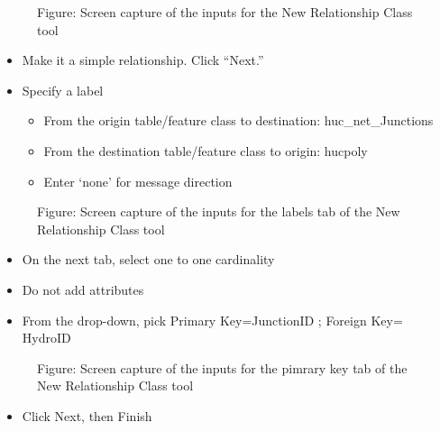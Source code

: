 \documentclass[letterpaper,10pt,english]{sphinxmanual}
\begin{document}
\begin{figure}[htbp]
\centering
\capstart

\noindent{}
\caption{Figure: Screen capture of the inputs for the New Relationship Class tool}\label{\detokenize{ex_2:id40}}\end{figure}
\begin{itemize}
\item {} 
Make it a simple relationship. Click “Next.”

\item {} 
Specify a label
\begin{itemize}
\item {} 
From the origin table/feature class to destination: huc\_net\_Junctions

\item {} 
From the destination table/feature class to origin: hucpoly

\item {} 
Enter ‘none’ for message direction

\end{itemize}

\end{itemize}

\begin{figure}[htbp]
\centering
\capstart

\noindent{}
\caption{Figure: Screen capture of the inputs for the labels tab of the New Relationship Class tool}\label{\detokenize{ex_2:id41}}\end{figure}
\begin{itemize}
\item {} 
On the next tab, select one to one cardinality

\item {} 
Do not add attributes

\item {} 
From the drop-down, pick Primary Key=JunctionID ; Foreign Key= HydroID

\end{itemize}

\begin{figure}[htbp]
\centering
\capstart

\noindent{}
\caption{Figure: Screen capture of the inputs for the pimrary key tab of the New Relationship Class tool}\label{\detokenize{ex_2:id42}}\end{figure}
\begin{itemize}
\item {} 
Click Next, then Finish

\end{itemize}
\end{document}
